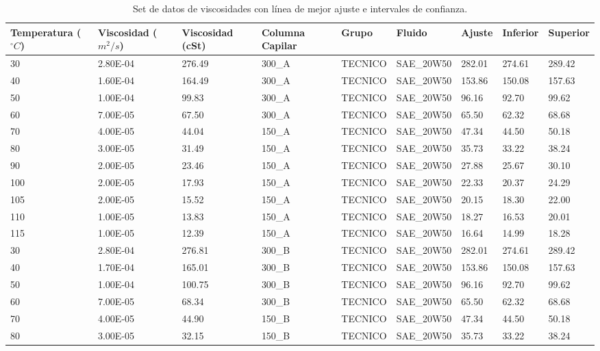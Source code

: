 \documentclass[12pt, letterpaper]{article}
\begin{document}
\begin{table}[ht]
\centering
\caption{Set de datos de viscosidades con línea de mejor ajuste e intervales de confianza.}
\begin{tabular}{p{1.8cm}|p{1.5cm}p{1.5cm}p{1.5cm}p{1.5cm}p{2cm}p{1.2cm}p{1.2cm}p{1.2cm}}
  \hline
Temperatura ($^{\circ}C$) & Viscosidad ($m^{2}/s$) & Viscosidad (cSt) & Columna Capilar  & Grupo & Fluido & Ajuste & Inferior & Superior \\ 
  \hline
  30 & 2.80E-04 & 276.49 & 300\_A & TECNICO & SAE\_20W50 & 282.01 & 274.61 & 289.42 \\ 
  40 & 1.60E-04 & 164.49 & 300\_A & TECNICO & SAE\_20W50 & 153.86 & 150.08 & 157.63 \\ 
  50 & 1.00E-04 & 99.83 & 300\_A & TECNICO & SAE\_20W50 & 96.16 & 92.70 & 99.62 \\ 
  60 & 7.00E-05 & 67.50 & 300\_A & TECNICO & SAE\_20W50 & 65.50 & 62.32 & 68.68 \\ 
  70 & 4.00E-05 & 44.04 & 150\_A & TECNICO & SAE\_20W50 & 47.34 & 44.50 & 50.18 \\ 
  80 & 3.00E-05 & 31.49 & 150\_A & TECNICO & SAE\_20W50 & 35.73 & 33.22 & 38.24 \\ 
  90 & 2.00E-05 & 23.46 & 150\_A & TECNICO & SAE\_20W50 & 27.88 & 25.67 & 30.10 \\ 
  100 & 2.00E-05 & 17.93 & 150\_A & TECNICO & SAE\_20W50 & 22.33 & 20.37 & 24.29 \\ 
  105 & 2.00E-05 & 15.52 & 150\_A & TECNICO & SAE\_20W50 & 20.15 & 18.30 & 22.00 \\ 
  110 & 1.00E-05 & 13.83 & 150\_A & TECNICO & SAE\_20W50 & 18.27 & 16.53 & 20.01 \\ 
  115 & 1.00E-05 & 12.39 & 150\_A & TECNICO & SAE\_20W50 & 16.64 & 14.99 & 18.28 \\ 
  30 & 2.80E-04 & 276.81 & 300\_B & TECNICO & SAE\_20W50 & 282.01 & 274.61 & 289.42 \\ 
  40 & 1.70E-04 & 165.01 & 300\_B & TECNICO & SAE\_20W50 & 153.86 & 150.08 & 157.63 \\ 
  50 & 1.00E-04 & 100.75 & 300\_B & TECNICO & SAE\_20W50 & 96.16 & 92.70 & 99.62 \\ 
  60 & 7.00E-05 & 68.34 & 300\_B & TECNICO & SAE\_20W50 & 65.50 & 62.32 & 68.68 \\ 
  70 & 4.00E-05 & 44.90 & 150\_B & TECNICO & SAE\_20W50 & 47.34 & 44.50 & 50.18 \\ 
  80 & 3.00E-05 & 32.15 & 150\_B & TECNICO & SAE\_20W50 & 35.73 & 33.22 & 38.24 \\ 

\end{tabular}
\end{table}
\end{document}
